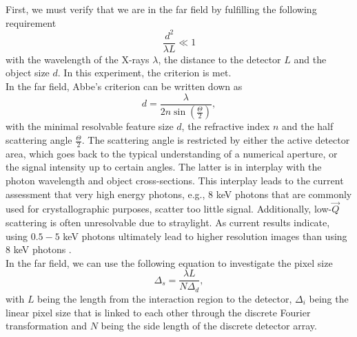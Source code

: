 First, we must verify that we are in the far field by fulfilling the following requirement \cite{Williams-2010-NJP}
\begin{equation}
\frac{d^{2}}{\lambda L} \ll 1
\label{eq:far-field-test}
\end{equation}
with the wavelength of the X-rays $\lambda$, the distance to the detector $L$ and the object size $d$. In this experiment, the criterion is met.\\
In the far field, Abbe's criterion can be written down as
\begin{equation}
    d = \frac{\lambda}{2n \sin(\frac{\Theta}{2})},
		\label{eq:abbe-criterion}
\end{equation}
with the minimal resolvable feature size $d$, the refractive index $n$ and the half scattering angle $\frac{\Theta}{2}$. The scattering angle is restricted by either the active detector area, which goes back to the typical understanding of a numerical aperture, or the signal intensity up to certain angles. The latter is in interplay with the photon wavelength and object cross-sections. This interplay leads to the current assessment that very high energy photons, e.g., $8$ keV photons that are commonly used for crystallographic purposes, scatter too little signal. Additionally, low-$\vec{Q}$ scattering is often unresolvable due to straylight. As current results indicate, using $0.5-5$ keV photons ultimately lead to higher resolution images than using $8$ keV photons \citep{Aquila-2015-StrucDyn}.\\
In the far field, we can use the following equation to investigate the pixel size \cite{Williams-2010-NJP}
\begin{equation}
    \Delta_{s} = \frac{\lambda L}{N \Delta_{d}},
\label{eq:relation-pixel-fourier}
\end{equation}
with $L$ being the length from the interaction region to the detector, $\Delta_{i}$ being the linear pixel size that is linked to each other through the discrete Fourier transformation and $N$ being the side length of the discrete detector array.\\

